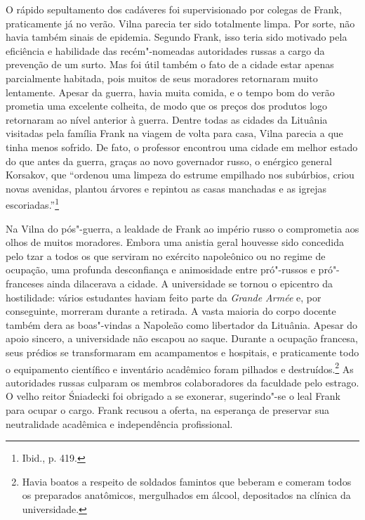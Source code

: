 
O rápido sepultamento dos cadáveres foi supervisionado por colegas de
Frank, praticamente já no verão. Vilna parecia ter sido totalmente
limpa. Por sorte, não havia também sinais de epidemia. Segundo Frank,
isso teria sido motivado pela eficiência e habilidade das recém"-nomeadas
autoridades russas a cargo da prevenção de um surto. Mas foi útil também
o fato de a cidade estar apenas parcialmente habitada, pois muitos de
seus moradores retornaram muito lentamente. Apesar da guerra, havia
muita comida, e o tempo bom do verão prometia uma excelente colheita, de
modo que os preços dos produtos logo retornaram ao nível anterior à
guerra. Dentre todas as cidades da Lituânia visitadas pela família Frank
na viagem de volta para casa, Vilna parecia a que tinha menos sofrido.
De fato, o professor encontrou uma cidade em melhor estado do que antes
da guerra, graças ao novo governador russo, o enérgico general Korsakov,
que ``ordenou uma limpeza do estrume empilhado nos subúrbios, criou
novas avenidas, plantou árvores e repintou as casas manchadas e as
igrejas escoriadas.''\footnote{Ibid., p. 419.}

Na Vilna do pós"-guerra, a lealdade de Frank ao império russo o
comprometia aos olhos de muitos moradores. Embora uma anistia geral
houvesse sido concedida pelo tzar a todos os que serviram no exército
napoleônico ou no regime de ocupação, uma profunda desconfiança e
animosidade entre pró"-russos e pró"-franceses ainda dilacerava a cidade.
A universidade se tornou o epicentro da hostilidade: vários estudantes
haviam feito parte da \textit{Grande Armée} e, por conseguinte, morreram
durante a retirada. A vasta maioria do corpo docente também dera as
boas"-vindas a Napoleão como libertador da Lituânia. Apesar do apoio
sincero, a universidade não escapou ao saque. Durante a ocupação
francesa, seus prédios se transformaram em acampamentos e hospitais, e
praticamente todo o equipamento científico e inventário acadêmico foram
pilhados e destruídos.\footnote{Havia boatos a respeito de soldados famintos que
beberam e comeram todos os preparados anatômicos, mergulhados em álcool,
depositados na clínica da universidade.} As autoridades russas culparam
os membros colaboradores da faculdade pelo estrago. O velho reitor
Śniadecki foi obrigado a se exonerar, sugerindo"-se o leal Frank para
ocupar o cargo. Frank recusou a oferta, na esperança de preservar sua
neutralidade acadêmica e independência profissional.

